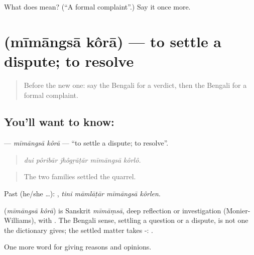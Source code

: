 \begin{tcolorbox}[breakable,colback=teal!4,colframe=teal!35!black,title={Before you move on}]
What does  mean? (\textquotedblleft{}A formal complaint\textquotedblright{}.) Say it once more.
\end{tcolorbox}
\section[\texorpdfstring{\bn{মীমাংসা} \bn{করা} (mīmāngsā kôrā)}{মীমাংসা করা (mīmāngsā kôrā)}]{  (mīmāngsā kôrā) — to settle a dispute; to resolve}

\label{lesson:BN-C342-mimangsa-kora}



\begin{quote}
Before the new one: say the Bengali for a verdict, then the Bengali for a formal complaint.
\end{quote}

\subsection*{You'll want to know:  }
\textbf{ } — \emph{mīmāngsā kôrā} — \textquotedblleft{}to settle a dispute; to resolve\textquotedblright{}.

\begin{quote}
    
\end{quote}

\begin{quote}
\emph{dui pôribār jhôgṛāṭār mīmāngsā kôrlô.}
\end{quote}

\begin{quote}
The two families settled the quarrel.
\end{quote}

Past (he/she …):    , \emph{tini māmlāṭār mīmāngsā kôrlen}.

\begin{cousinweb}
\textbf{ } (\emph{mīmāngsā kôrā}) is Sanskrit \emph{mīmāṃsā}, deep reflection or investigation (Monier-Williams), with . The Bengali sense, settling a question or a dispute, is not one the dictionary gives; the settled matter takes -:  .
\end{cousinweb}

\begin{grammarlens}[title={What you've built}]
One more word for giving reasons and opinions.
\end{grammarlens}

